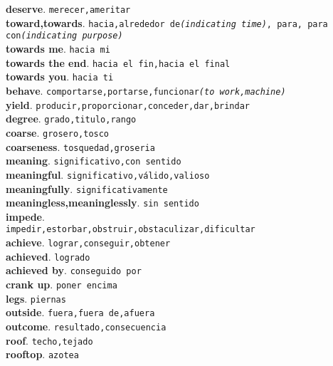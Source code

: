 \documentclass[twocolumn]{article}
\begin{document}
	\textsf{\textbf{deserve}}. \texttt{merecer,ameritar}\\
	\textsf{\textbf{toward,towards}}. \texttt{hacia,alrededor de{\scriptsize \textsl{(indicating time)}}, para, para con{\scriptsize \textsl{(indicating purpose)}}}\\
	\textsf{\textbf{towards me}}. \texttt{hacia mi}\\
	\textsf{\textbf{towards the end}}. \texttt{hacia el fin,hacia el final}\\
	\textsf{\textbf{towards you}}. \texttt{hacia ti}\\
	\textsf{\textbf{behave}}. \texttt{comportarse,portarse,funcionar{\scriptsize \textsl{(to work,machine)}}}\\
	\textsf{\textbf{yield}}. \texttt{producir,proporcionar,conceder,dar,brindar}\\
	\textsf{\textbf{degree}}. \texttt{grado,titulo,rango}\\
	\textsf{\textbf{coarse}}. \texttt{grosero,tosco}\\
	\textsf{\textbf{coarseness}}. \texttt{tosquedad,groseria}\\
	\textsf{\textbf{meaning}}. \texttt{significativo,con sentido}\\
	\textsf{\textbf{meaningful}}. \texttt{significativo,v\'alido,valioso}\\
	\textsf{\textbf{meaningfully}}. \texttt{significativamente}\\
	\textsf{\textbf{meaningless,meaninglessly}}. \texttt{sin sentido}\\
	\textsf{\textbf{impede}}.\\ \texttt{impedir,estorbar,obstruir,obstaculizar,dificultar}\\
	\textsf{\textbf{achieve}}. \texttt{lograr,conseguir,obtener}\\
	\textsf{\textbf{achieved}}. \texttt{logrado}\\
	\textsf{\textbf{achieved by}}. \texttt{conseguido por}\\
	\textsf{\textbf{crank up}}. \texttt{poner encima}\\
	\textsf{\textbf{legs}}. \texttt{piernas}\\
	\textsf{\textbf{outside}}. \texttt{fuera,fuera de,afuera}\\
	\textsf{\textbf{outcome}}. \texttt{resultado,consecuencia}\\
	\textsf{\textbf{roof}}. \texttt{techo,tejado}\\
	\textsf{\textbf{rooftop}}. \texttt{azotea}\\
\end{document}
